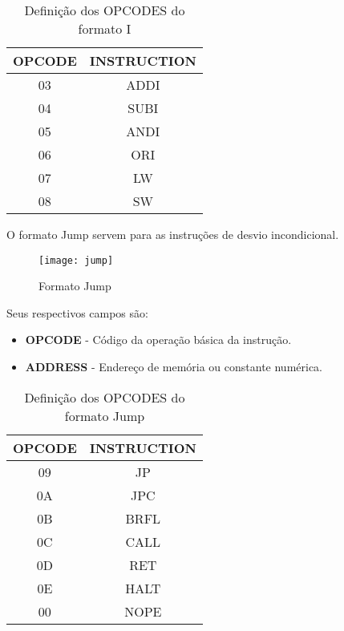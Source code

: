 \begin{table}[H]
\centering	
\begin{tabular}{|c|c|}
	\hline 
	OPCODE & INSTRUCTION \\ 
	\hline 
	03 & ADDI \\ 
	\hline 
	04 & SUBI \\ 
	\hline 
	05 & ANDI \\ 
	\hline 
	06 & ORI \\ 
	\hline 
	07 & LW \\ 
	\hline 
	08 & SW \\ 
	\hline 
	\end{tabular} 
	  	\caption{Definição dos OPCODES do formato I}	
\end{table}	
	
 O formato Jump servem para as instruções de desvio incondicional.  	
   	\begin{figure}[H]
    	\centering
    	\texttt{[image: jump]}
    	\caption{Formato Jump}
		\label{jump}
  	\end{figure}
Seus respectivos campos são:
	\begin{itemize}
	\item \textbf{OPCODE} - Código da operação básica da instrução.
	\item \textbf{ADDRESS} - Endereço de memória ou constante numérica.
\end{itemize}
 
\begin{table}[H]
\centering 	
  	\begin{tabular}{|c|c|}
  	\hline 
  	OPCODE & INSTRUCTION \\ 
  	\hline 
  	09 & JP \\ 
  	\hline 
  	0A & JPC \\ 
  	\hline 
  	0B & BRFL \\ 
  	\hline 
  	0C & CALL \\ 
  	\hline 
  	0D & RET \\ 
  	\hline 
  	0E & HALT \\ 
  	\hline 
  	00 & NOPE \\ 
  	\hline 
  	\end{tabular} 
  	  	\caption{Definição dos OPCODES do formato Jump}
\end{table}
 